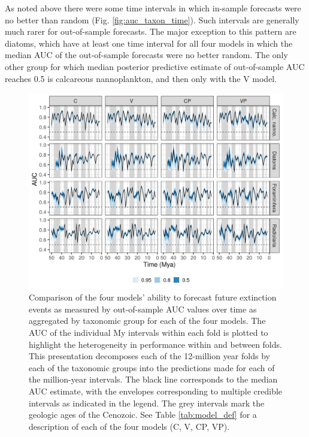 \documentclass[12pt,letterpaper]{article}
\begin{document}
\begin{refsection}
As noted above there were some time intervals in which in-sample forecasts were no better than random (Fig. \ref{fig:auc_taxon_time}). Such intervals are generally much rarer for out-of-sample forecasts. The major exception to this pattern are diatoms, which have at least one time interval for all four models in which the median AUC of the out-of-sample forecasts were no better random. The only other group for which median posterior predictive estimate of out-of-sample AUC reaches 0.5 is calcareous nannoplankton, and then only with the V model.
\begin{figure}[ht]
 \centering
 \includegraphics[width=\textwidth,height=0.5\textheight,keepaspectratio=true]{../results/figure/fold_auc_taxon_time_full}
 \caption{Comparison of the four models' ability to forecast future extinction events as measured by out-of-sample AUC values over time as aggregated by taxonomic group for each of the four models. The AUC of the individual My intervals within each fold is plotted to highlight the heterogeneity in performance within and between folds. This presentation decomposes each of the 12-million year folds by each of the taxonomic groups into the predictions made for each of the million-year intervals. The black line corresponds to the median AUC estimate, with the envelopes corresponding to multiple credible intervals as indicated in the legend. The grey intervals mark the geologic ages of the Cenozoic. See Table \ref{tab:model_def} for a description of each of the four models (C, V, CP, VP).}
 \label{fig:fold_auc_taxon_time}
\end{figure}


\end{refsection}
\end{document}
